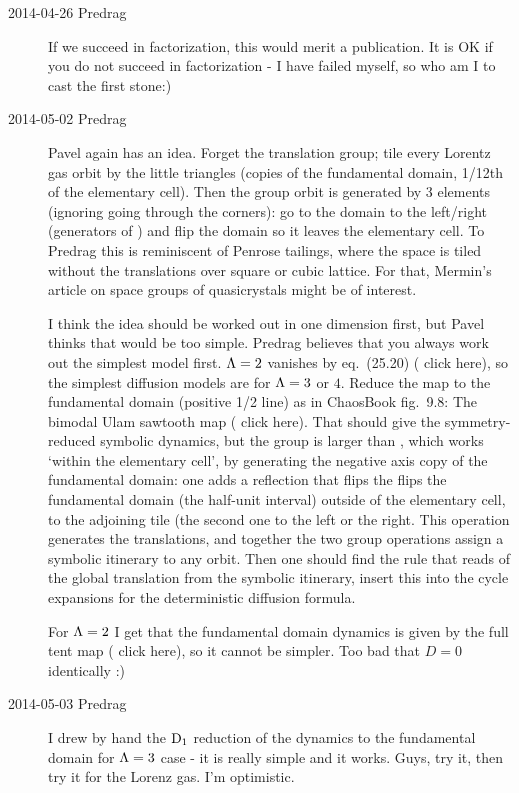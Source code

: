 \begin{description}
\item[2014-04-26 Predrag]
If we succeed in factorization, this would merit a publication.
It is OK if you do not succeed in factorization - I have failed myself, so
who am I to cast the first stone:)

\item[2014-05-02 Predrag]
Pavel again has an idea. Forget the translation group; tile every Lorentz
gas orbit by the little triangles (copies of the fundamental domain,
1/12th of the elementary cell). Then the group orbit is generated by 3
elements (ignoring going through the corners): go to the domain to the
left/right (generators of ) and flip the domain so it leaves the
elementary cell. To Predrag this is reminiscent of Penrose tailings,
where the space is tiled without the translations over square or cubic
lattice. For that, Mermin's article on space groups of
quasicrystals might be of interest.

I think the idea should be worked out in one dimension first, but Pavel
thinks that would be too simple. Predrag believes that you always work
out the simplest model first. $\Lambda =2$ vanishes by eq.~(25.20)
( {click
here}), so the simplest diffusion models are for $\Lambda =3$ or $4$.
Reduce the map to the fundamental domain (positive 1/2 line) as in
ChaosBook fig.~9.8: The bimodal Ulam sawtooth map
( {click
here}). That should give the symmetry-reduced symbolic dynamics, but the
group is larger than , which works `within the elementary cell', by
generating the negative axis copy of the fundamental domain: one adds a
reflection that flips the flips the fundamental domain (the half-unit
interval) outside of the elementary cell, to the adjoining tile (the
second one to the left or the right. This operation generates the
translations, and together the two group operations assign a symbolic
itinerary to any orbit. Then one should find the rule that reads of the
global translation from the symbolic itinerary, insert this into the
cycle expansions for the deterministic diffusion formula.

For $\Lambda =2$ I get that the fundamental domain dynamics is given by
the full tent map
( {click
here}), so it cannot be simpler. Too bad that $D=0$ identically :)

\item[2014-05-03 Predrag] I drew by hand the $\textrm{D}_{1}$ reduction of the
dynamics to the fundamental domain for $\Lambda =3$ case - it is really
simple and it works. Guys, try it, then try it for the Lorenz gas. I'm
optimistic.


\end{description}

